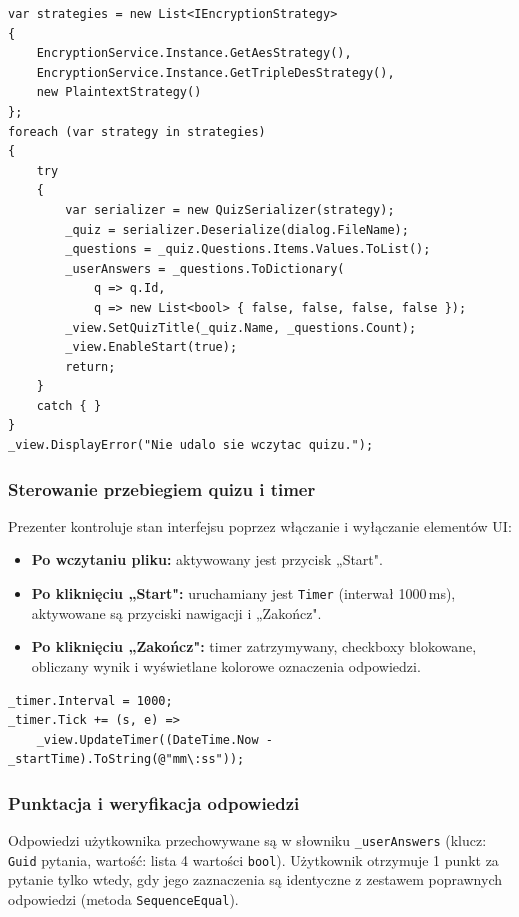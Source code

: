 \documentclass[12pt,a4paper]{article}
\begin{document}
\begin{lstlisting}
var strategies = new List<IEncryptionStrategy>
{
    EncryptionService.Instance.GetAesStrategy(),
    EncryptionService.Instance.GetTripleDesStrategy(),
    new PlaintextStrategy()
};
foreach (var strategy in strategies)
{
    try
    {
        var serializer = new QuizSerializer(strategy);
        _quiz = serializer.Deserialize(dialog.FileName);
        _questions = _quiz.Questions.Items.Values.ToList();
        _userAnswers = _questions.ToDictionary(
            q => q.Id,
            q => new List<bool> { false, false, false, false });
        _view.SetQuizTitle(_quiz.Name, _questions.Count);
        _view.EnableStart(true);
        return;
    }
    catch { }
}
_view.DisplayError("Nie udalo sie wczytac quizu.");
\end{lstlisting}

\subsubsection{Sterowanie przebiegiem quizu i timer}

Prezenter kontroluje stan interfejsu poprzez włączanie i wyłączanie elementów UI:
\begin{itemize}
    \item \textbf{Po wczytaniu pliku:} aktywowany jest przycisk „Start".
    \item \textbf{Po kliknięciu „Start":} uruchamiany jest \texttt{Timer} (interwał 1000\,ms),
          aktywowane są przyciski nawigacji i „Zakończ".
    \item \textbf{Po kliknięciu „Zakończ":} timer zatrzymywany, checkboxy blokowane,
          obliczany wynik i wyświetlane kolorowe oznaczenia odpowiedzi.
\end{itemize}

\begin{lstlisting}
_timer.Interval = 1000;
_timer.Tick += (s, e) =>
    _view.UpdateTimer((DateTime.Now - _startTime).ToString(@"mm\:ss"));
\end{lstlisting}

\subsubsection{Punktacja i weryfikacja odpowiedzi}

Odpowiedzi użytkownika przechowywane są w słowniku \texttt{\_userAnswers} (klucz: \texttt{Guid} pytania,
wartość: lista 4 wartości \texttt{bool}). Użytkownik otrzymuje 1 punkt za pytanie tylko wtedy,
gdy jego zaznaczenia są identyczne z zestawem poprawnych odpowiedzi (metoda \texttt{SequenceEqual}).
\end{document}
